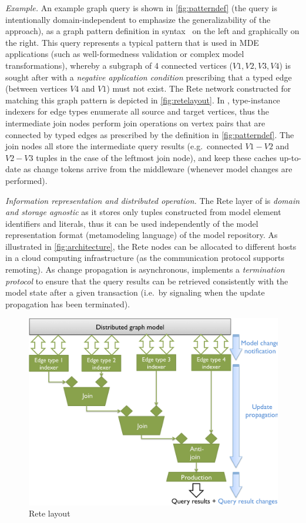 \emph{Example.}
An example graph query is shown in \autoref{fig:patterndef} (the query is intentionally domain-independent to emphasize the generalizability of the approach), as a graph pattern definition in \incquery{} syntax~\cite{models10} on the left and graphically on the right. This query represents a typical pattern that is used in MDE applications (such as well-formedness validation or complex model transformations), whereby a subgraph of 4 connected vertices ($V1, V2, V3, V4$) is sought after with a \emph{negative application condition} prescribing that a typed edge (between vertices $V4$ and $V1$) must not exist.
The Rete network constructed for matching this graph pattern is depicted in \autoref{fig:retelayout}. In \incqueryD{}, type-instance indexers for edge types enumerate all source and target vertices, thus the intermediate join nodes perform join operations on vertex pairs that are connected by typed edges as prescribed by the definition in \autoref{fig:patterndef}. The join nodes all store the intermediate query results (e.g.\ connected $V1-V2$ and $V2-V3$ tuples in the case of the leftmost join node), and keep these caches up-to-date as change tokens arrive from the middleware (whenever model changes are performed).

\emph{Information representation and distributed operation.} The Rete layer of \incqueryD{} is \emph{domain and storage agnostic} as it stores only tuples constructed from model element identifiers and literals, thus it can be used independently of the model representation format (metamodeling language) of the model repository.
As illustrated in \autoref{fig:architecture}, the Rete nodes can be allocated to different hosts in a cloud computing infrastructure (as the communication protocol supports remoting). As change propagation is asynchronous, \incqueryD{} implements a \emph{termination protocol} to ensure that the query results can be retrieved consistently with the model state after a given transaction (i.e.\ by signaling when the update propagation has been terminated).

\begin{figure}[!tb]
\begin{center}
\includegraphics[width=.8\columnwidth]{figures/reteinternals}
\caption{Rete layout}
\label{fig:retelayout}
\end{center}
\end{figure}

